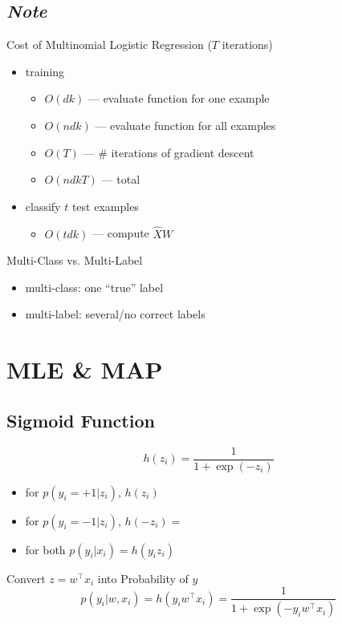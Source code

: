 \documentclass[10pt,landscape,a4paper]{article}
\begin{document}
\begin{multicols*}{5}
\subsection{\emph{Note}}
Cost of Multinomial Logistic Regression (\(T\) iterations) \\
\begin{itemize}
    \item training
    \begin{itemize}
        \item \(O(dk)\) --- evaluate function for one example
        \item \(O(ndk)\) --- evaluate function for all examples
        \item \(O(T)\) --- \# iterations of gradient descent
        \item \(O(ndkT)\) --- total
    \end{itemize}
    \item classify \(t\) test examples
    \begin{itemize}
        \item \(O(tdk)\) --- compute \(\hat{X} W\)
    \end{itemize}
\end{itemize}
Multi-Class vs. Multi-Label
\begin{itemize}
    \item multi-class: one ``true'' label
    \item multi-label: several/no correct labels
\end{itemize}

\section{MLE \& MAP}

\subsection{Sigmoid Function}
\begin{dmath*}
    h(z_i) = \frac{1}{1+\exp(-z_i)}
\end{dmath*}
\begin{itemize}
    \item for \(p(y_i=+1|z_i)\), \(h(z_i)\)
    \item for \(p(y_i=-1|z_i)\), \(h(-z_i) =\)
    \item for both \(p(y_i|x_i) = h(y_i z_i)\)
\end{itemize}
Convert \(z = w^\intercal x_i\) into Probability of \(y\)
\begin{dmath*}
    p(y_i|w,x_i) = h(y_i w^\intercal x_i) = \frac{1}{1+\exp(-y_i w^\intercal x_i)}
\end{dmath*}


\end{multicols*}
\end{document}
